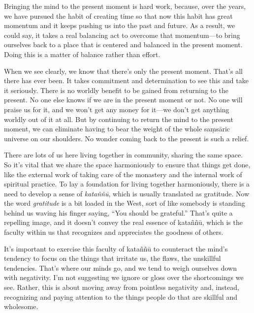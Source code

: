 Bringing the mind to the present moment is hard work, because, over the 
years, we have pursued the habit of creating time so that now this 
habit has great momentum and it keeps pushing us into the past and 
future. As a result, we could say, it takes a real balancing act to 
overcome that momentum---to bring ourselves back to a place that is 
centered and balanced in the present moment. Doing this is a matter of 
balance rather than effort.

When we see clearly, we know that there's only the present moment. 
That's all there has ever been. It takes commitment and determination 
to see this and take it seriously. There is no worldly benefit to be 
gained from returning to the present. No one else knows if we are in 
the present moment or not. No one will praise us for it, and we won't 
get any money for it---we don't get anything worldly out of it at all. 
But by continuing to return the mind to the present moment, we can 
eliminate having to bear the weight of the whole saṃsāric universe 
on our shoulders. No wonder coming back to the present is such a relief.


There are lots of us here living together in community, sharing the 
same space. So it's vital that we share the space harmoniously to 
ensure that things get done, like the external work of taking care of 
the monastery and the internal work of spiritual practice. To lay a 
foundation for living together harmoniously, there is a need to develop 
a sense of \emph{kataññū}, which is usually translated as gratitude. 
Now the word \emph{gratitude} is a bit loaded in the West, sort of like 
somebody is standing behind us waving his finger saying, ``You should 
be grateful.'' That's quite a repelling image, and it doesn't convey 
the real essence of kataññū, which is the faculty within us that 
recognizes and appreciates the goodness of others.

It's important to exercise this faculty of kataññū to counteract the 
mind's tendency to focus on the things that irritate us, the flaws, the 
unskillful tendencies. That's where our minds go, and we tend to weigh 
ourselves down with negativity. I'm not suggesting we ignore or gloss 
over the shortcomings we see. Rather, this is about moving away from 
pointless negativity and, instead, recognizing and paying attention to 
the things people do that are skillful and wholesome.

